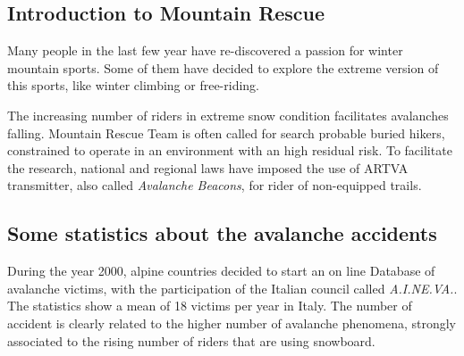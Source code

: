 
\begin{fullwidth}
\chapter{Introduction to Mountain Rescue \label{ch:chapter1}}
\end{fullwidth}
\minitoc
\thispagestyle{plain}

Many people in the last few year have re-discovered a passion for winter mountain sports. Some of them have decided to explore the extreme version of this sports, like winter climbing or free-riding.

The increasing number of riders in extreme snow condition facilitates avalanches falling. Mountain Rescue Team is often called for search probable buried hikers, constrained to operate in an environment with an high residual risk. To facilitate the research, national and regional laws\cite{ARTVAobbligationLaw} have imposed the use of ARTVA transmitter, also called \emph{Avalanche Beacons}, for rider of non-equipped trails.

\section{Some statistics about the avalanche accidents}

During the year 2000, alpine countries decided to start an on line Database of avalanche victims, with the participation of the Italian council called \emph{A.I.NE.VA.}. The statistics show a mean of 18 victims per year in Italy. The number of accident is clearly related to the higher number of avalanche phenomena, strongly associated to the rising number of riders that are using snowboard. 

